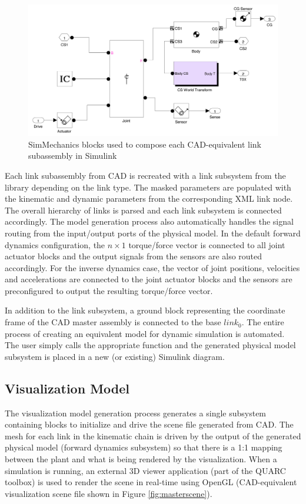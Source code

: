 \begin{figure}[!h]
	\centering
    \includegraphics[scale=0.6]{fig/toolchain/undermask.pdf}
  	\caption{SimMechanics blocks used to compose each CAD-equivalent link subassembly in Simulink}
	\label{fig:undermask}
\end{figure}

Each link subassembly from CAD is recreated with a link subsystem from the library depending on the link type. The masked parameters are populated with the kinematic and dynamic parameters from the corresponding XML link node. The overall hierarchy of links is parsed and each link subsystem is connected accordingly. The model generation process also automatically handles the signal routing from the input/output ports of the physical model. In the default forward dynamics configuration, the $n \times 1$ torque/force vector is connected to all joint actuator blocks and the output signals from the sensors are also routed accordingly. For the inverse dynamics case, the vector of joint positions, velocities and accelerations are connected to the joint actuator blocks and the sensors are preconfigured to output the resulting torque/force vector.

In addition to the link subsystem, a ground block representing the coordinate frame of the CAD master assembly is connected to the base $link_{0}$. The entire process of creating an equivalent model for dynamic simulation is automated. The user simply calls the appropriate function and the generated physical model subsystem is placed in a new (or existing) Simulink diagram.

\subsection{Visualization Model} %
\label{sub:visualization_model}
The visualization model generation process generates a single subsystem containing blocks to initialize and drive the scene file generated from CAD. The mesh for each link in the kinematic chain is driven by the output of the generated physical model (forward dynamics subsystem) so that there is a 1:1 mapping between the plant and what is being rendered by the visualization. When a simulation is running, an external 3D viewer application (part of the QUARC toolbox) is used to render the scene in real-time using OpenGL (CAD-equivalent visualization scene file shown in Figure \ref{fig:masterscene}).

